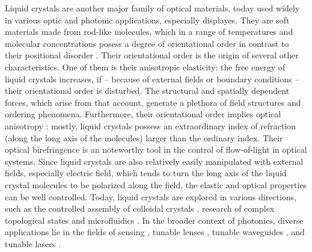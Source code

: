 \documentclass[a4paper,11pt]{article}
\begin{document}

Liquid crystals are another major family of optical materials, today used widely in various optic and photonic applications, especially displayes. 
They are soft materials made from rod-like molecules, which in a range of temperatures and molecular concentrations posess a degree of orientational order in contrast to their positional disorder \cite{degennes}. 
Their orientational order is the origin of several other characteristics. 
One of them is their anisotropic elasticity: the free energy of liquid crystals increases, if -- because of external fields or boundary conditions -- their orientational order is disturbed. 
The structural and spatially dependent forces, which arise from that account, generate a plethora of field structures and ordering phenomena. 
Furthermore, their orientational order implies optical anisotropy \cite{hecht-optics}: mostly, liquid crystals possess an extraordinary index of refraction (along the long axis of the molecules) larger than the ordinary index. 
Their optical birefringence is an noteworthy tool in the control of flow-of-light in optical systems. 
Since liquid crystals are also relatively easily manipulated with external fields, especially electric field, which tends to turn the long axis of the liquid crystal molecules to be polarized along the field, the elastic and optical properties can be well controlled.
Today, liquid crystals are explored in various directions, such as the controlled assembly of colloidal crystals \cite{zumer-2006-assembly,musevic-2013-assembly}, research of complex topological states \cite{musevic-2011-knots,smalyukh-2014-knots,zumer-2014-knots} and microfluidics \cite{yeomans-2013-lc-microfluidics}.
In the broader context of photonics, diverse applications lie in the fields of sensing \cite{abbott-2013-sensing}, tunable lenses \cite{neyts-2017-lensing,lin-2011-lensing}, tunable waveguides \cite{kitzerow-2014-fibres}, and tunable lasers \cite{humar-2016-lasing}.

\end{document}
